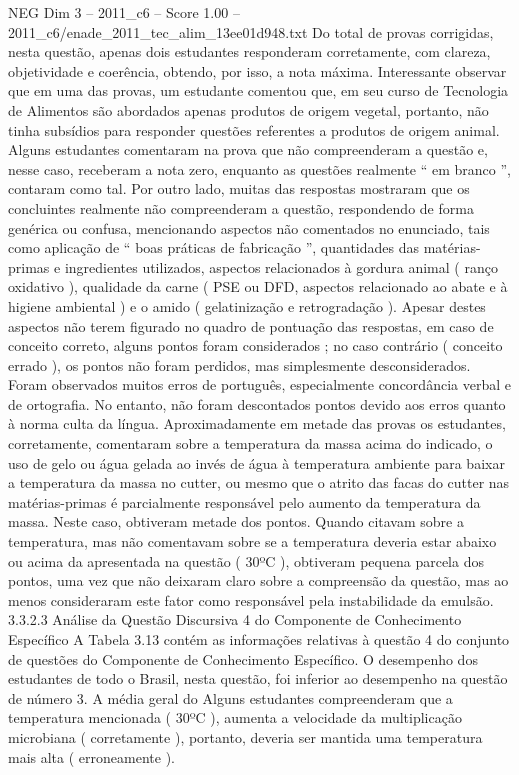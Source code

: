 \begin{textsample}{NEG Dim 3 – 2011\_c6 – Score 1.00 – 2011\_c6/enade\_2011\_tec\_alim\_13ee01d948.txt}
Do total de provas corrigidas, nesta questão, apenas dois estudantes responderam corretamente, com clareza, objetividade e coerência, obtendo, por isso, a nota máxima.
Interessante observar que em uma das provas, um estudante comentou que, em seu curso de Tecnologia de Alimentos são abordados apenas produtos de origem vegetal, portanto, não tinha subsídios para responder questões referentes a produtos de origem animal.
Alguns estudantes comentaram na prova que não compreenderam a questão e, nesse caso, receberam a nota zero, enquanto as questões realmente “ em branco ”, contaram como tal.
Por outro lado, muitas das respostas mostraram que os concluintes realmente não compreenderam a questão, respondendo de forma genérica ou confusa, mencionando aspectos não comentados no enunciado, tais como aplicação de “ boas práticas de fabricação ”, quantidades das matérias-primas e ingredientes utilizados, aspectos relacionados à gordura animal ( ranço oxidativo ), qualidade da carne ( PSE ou DFD, aspectos relacionado ao abate e à higiene ambiental ) e o amido ( gelatinização e retrogradação ).
Apesar destes aspectos não terem figurado no quadro de pontuação das respostas, em caso de conceito correto, alguns pontos foram considerados ; no caso contrário ( conceito errado ), os pontos não foram perdidos, mas simplesmente desconsiderados.
Foram observados muitos erros de português, especialmente concordância verbal e de ortografia.
No entanto, não foram descontados pontos devido aos erros quanto à norma culta da língua.
Aproximadamente em metade das provas os estudantes, corretamente, comentaram sobre a temperatura da massa acima do indicado, o uso de gelo ou água gelada ao invés de água à temperatura ambiente para baixar a temperatura da massa no cutter, ou mesmo que o atrito das facas do cutter nas matérias-primas é parcialmente responsável pelo aumento da temperatura da massa.
Neste caso, obtiveram metade dos pontos.
Quando citavam sobre a temperatura, mas não comentavam sobre se a temperatura deveria estar abaixo ou acima da apresentada na questão ( 30ºC ), obtiveram pequena parcela dos pontos, uma vez que não deixaram claro sobre a compreensão da questão, mas ao menos consideraram este fator como responsável pela instabilidade da emulsão. 3.3.2.3 Análise da Questão Discursiva 4 do Componente de Conhecimento Específico A Tabela 3.13 contém as informações relativas à questão 4 do conjunto de questões do Componente de Conhecimento Específico.
O desempenho dos estudantes de todo o Brasil, nesta questão, foi inferior ao desempenho na questão de número 3.
A média geral do Alguns estudantes compreenderam que a temperatura mencionada ( 30ºC ), aumenta a velocidade da multiplicação microbiana ( corretamente ), portanto, deveria ser mantida uma temperatura mais alta ( erroneamente ).

\end{textsample}
